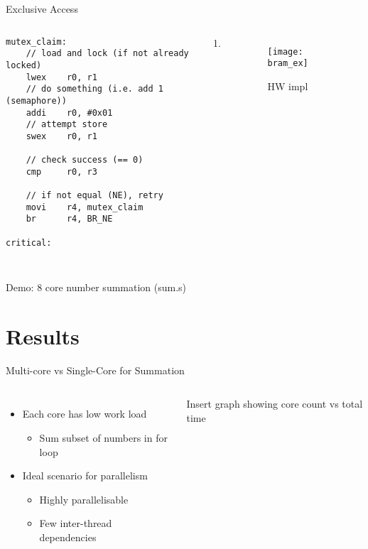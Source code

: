 \documentclass[aspectratio=169]{beamer}
\begin{document}
\begin{frame}[fragile]{Exclusive Access}

\begin{columns}[t]
\begin{lstlisting}[basicstyle=\tiny\ttfamily]
mutex_claim:
    // load and lock (if not already locked)
    lwex    r0, r1
    // do something (i.e. add 1 (semaphore))
    addi    r0, #0x01
    // attempt store
    swex    r0, r1
    
    // check success (== 0)
    cmp     r0, r3
    
    // if not equal (NE), retry
    movi    r4, mutex_claim
    br      r4, BR_NE
    
critical:
    
\end{lstlisting}
\begin{enumerate}
    \item 
\end{enumerate}
\begin{figure}
    \centering
    \texttt{[image: bram\_ex]}
    \caption{HW impl}
    \label{}
\end{figure}
\end{columns}
Demo: 8 core number summation (sum.s)
\end{frame}

\section{Results}
\frame{\tableofcontents[currentsection, subsectionstyle=show/show/hide]}

\begin{frame}{Multi-core vs Single-Core for Summation}
\begin{columns}[t]
\begin{itemize}\setlength{\itemsep 2em}
    \item Each core has low work load
        \begin{itemize}
            \item Sum subset of numbers in for loop
        \end{itemize}
    \item Ideal scenario for parallelism
    \begin{itemize}
        \item Highly parallelisable
        \item Few inter-thread dependencies
    \end{itemize}
\end{itemize}
Insert graph showing core count vs total time
\end{columns}
\end{frame}
\end{document}
